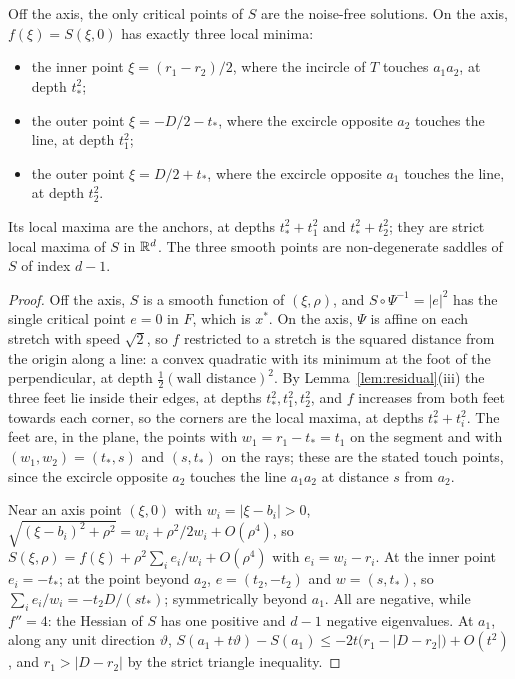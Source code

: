 \begin{theorem}\label{thm:triangle}
Off the axis, the only critical points of $S$ are the noise-free solutions. On the axis, $f(\xi) = S(\xi, 0)$ has exactly
three local minima:
\begin{itemize}[leftmargin=1.2em]
\item the inner point $\xi = (r_1 - r_2)/2$, where the incircle of $T$ touches $a_1a_2$, at depth $t_*^2$;
\item the outer point $\xi = -D/2 - t_*$, where the excircle opposite $a_2$ touches the line, at depth $t_1^2$;
\item the outer point $\xi = D/2 + t_*$, where the excircle opposite $a_1$ touches the line, at depth $t_2^2$.
\end{itemize}
Its local maxima are the anchors, at depths $t_*^2 + t_1^2$ and $t_*^2 + t_2^2$; they are strict local maxima of $S$ in
$\mathbb{R}^d$. The three smooth points are non-degenerate saddles of $S$ of index $d - 1$.
\end{theorem}

\begin{proof}
Off the axis, $S$ is a smooth function of $(\xi, \rho)$, and $S \circ \Psi^{-1} = |e|^2$ has the single critical point
$e = 0$ in $F$, which is $x^*$. On the axis, $\Psi$ is affine on each stretch with speed $\sqrt 2$, so $f$ restricted
to a stretch is the squared distance from the origin along a line: a convex quadratic with its minimum at the foot of
the perpendicular, at depth $\tfrac12(\text{wall distance})^2$. By Lemma~\ref{lem:residual}(iii) the three feet lie inside
their edges, at depths $t_*^2, t_1^2, t_2^2$, and $f$ increases from both feet towards each corner, so the corners are
the local maxima, at depths $t_*^2 + t_i^2$. The feet are, in the plane, the points with $w_1 = r_1 - t_* = t_1$ on the
segment and with $(w_1, w_2) = (t_*, s)$ and $(s, t_*)$ on the rays; these are the stated touch points, since the
excircle opposite $a_2$ touches the line $a_1a_2$ at distance $s$ from $a_2$.

Near an axis point $(\xi, 0)$ with $w_i = |\xi - b_i| > 0$, $\sqrt{(\xi - b_i)^2 + \rho^2} = w_i + \rho^2/2w_i + O(\rho^4)$,
so $S(\xi, \rho) = f(\xi) + \rho^2\sum_i e_i/w_i + O(\rho^4)$ with $e_i = w_i - r_i$. At the inner point $e_i = -t_*$; at the point beyond $a_2$,
$e = (t_2, -t_2)$ and $w = (s, t_*)$, so $\sum_i e_i/w_i = -t_2 D/(st_*)$; symmetrically beyond $a_1$. All are negative,
while $f'' = 4$: the Hessian of $S$ has one positive and $d-1$ negative eigenvalues. At $a_1$, along any unit direction
$\vartheta$, $S(a_1 + t\vartheta) - S(a_1) \le -2t\bigl(r_1 - |D - r_2|\bigr) + O(t^2)$, and $r_1 > |D - r_2|$ by the
strict triangle inequality.
\end{proof}

